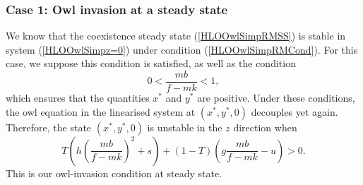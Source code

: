 \documentclass[12pt]{UOthesis}
\theoremstyle{remarkstyle}
\begin{document}
\subsubsection*{Case 1: Owl invasion at a steady state}

We know that the coexistence steady state (\ref{HLOOwlSimpRMSS}) is stable in system (\ref{HLOOwlSimpz=0}) under condition (\ref{HLOOwlSimpRMCond}). For this case, we suppose this condition is satisfied, as well as the condition
$$0<\frac{mb}{f-mk}<1,$$
which ensures that the quantities $x^*$ and $y^*$ are positive. Under these conditions, the owl equation in the linearised system at $(x^*,y^*,0)$ decouples yet again. Therefore, the state $(x^*,y^*,0)$ is unstable in the $z$ direction when
\begin{equation}
	T\left(h\left(\frac{mb}{f-mk}\right)^2+s\right)+(1-T)\left(g\frac{mb}{f-mk}-u\right)>0.
	\label{HLOOwlSimpOwlSSInvCond}
\end{equation}
This is our owl-invasion condition at steady state.\\
\end{document}
